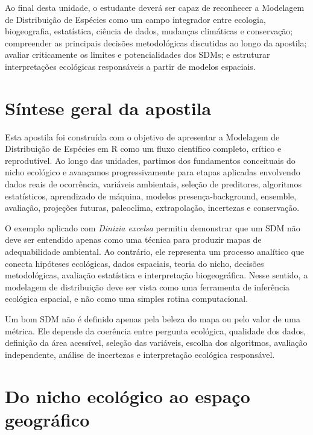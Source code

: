 \documentclass{ueap-sdm}
\begin{document}
\begin{objetivos}
	Ao final desta unidade, o estudante deverá ser capaz de reconhecer a Modelagem de Distribuição de Espécies como um campo integrador entre ecologia, biogeografia, estatística, ciência de dados, mudanças climáticas e conservação; compreender as principais decisões metodológicas discutidas ao longo da apostila; avaliar criticamente os limites e potencialidades dos SDMs; e estruturar interpretações ecológicas responsáveis a partir de modelos espaciais.
\end{objetivos}

\section{Síntese geral da apostila}

Esta apostila foi construída com o objetivo de apresentar a Modelagem de Distribuição de Espécies em R como um fluxo científico completo, crítico e reprodutível. Ao longo das unidades, partimos dos fundamentos conceituais do nicho ecológico e avançamos progressivamente para etapas aplicadas envolvendo dados reais de ocorrência, variáveis ambientais, seleção de preditores, algoritmos estatísticos, aprendizado de máquina, modelos presença-background, ensemble, avaliação, projeções futuras, paleoclima, extrapolação, incertezas e conservação.

O exemplo aplicado com \textit{Dinizia excelsa} permitiu demonstrar que um SDM não deve ser entendido apenas como uma técnica para produzir mapas de adequabilidade ambiental. Ao contrário, ele representa um processo analítico que conecta hipóteses ecológicas, dados espaciais, teoria do nicho, decisões metodológicas, avaliação estatística e interpretação biogeográfica. Nesse sentido, a modelagem de distribuição deve ser vista como uma ferramenta de inferência ecológica espacial, e não como uma simples rotina computacional.

\begin{conceito}[title={\faBook\quad Mensagem central da apostila}]
	Um bom SDM não é definido apenas pela beleza do mapa ou pelo valor de uma métrica. Ele depende da coerência entre pergunta ecológica, qualidade dos dados, definição da área acessível, seleção das variáveis, escolha dos algoritmos, avaliação independente, análise de incertezas e interpretação ecológica responsável.
\end{conceito}

\section{Do nicho ecológico ao espaço geográfico}
\end{document}

